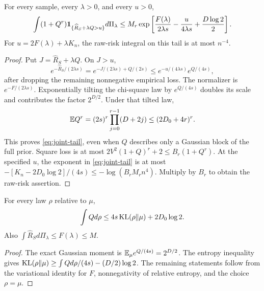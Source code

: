 \begin{lemma}
\label{lem:joint-tail}
For every sample, every $\lambda>0$, and every $u>0$,
\begin{equation}
 \int(1+Q^r)\mathbf1_{\{\widehat R_S+\lambda Q>u\}}d\Pi_\lambda
 \le M_r\exp\left[\frac{F(\lambda)}{2\lambda s}
                   -\frac{u}{4\lambda s}+\frac{D\log2}{2}\right].
 \label{eq:joint-tail}
\end{equation}
For $u=2F(\lambda)+\lambda K_n$, the raw-risk integral on this tail is at most $n^{-4}$.
\end{lemma}
\begin{proof}
Put $J=\widehat R_S+\lambda Q$. On $J>u$,
\[
 e^{-\widehat R_S/(2\lambda s)}
 =e^{-J/(2\lambda s)+Q/(2s)}
 \le e^{-u/(4\lambda s)}e^{Q/(4s)},
\]
after dropping the remaining nonnegative empirical loss. The normalizer is $e^{-F/(2\lambda s)}$. Exponentially tilting the chi-square law by $e^{Q/(4s)}$ doubles its scale and contributes the factor $2^{D/2}$. Under that tilted law,
\[
 \mathbb E Q^r=(2s)^r\prod_{j=0}^{r-1}(D+2j)
 \le(2D_0+4r)^r.
\]
This proves \eqref{eq:joint-tail}, even when $Q$ describes only a Gaussian block of the full prior. Square loss is at most
$2V^2(1+Q)^r+2\le B_r(1+Q^r)$.
At the specified $u$, the exponent in \eqref{eq:joint-tail} is at most
$-[K_n-2D_0\log2]/(4s)\le-\log(B_rM_rn^4)$.
Multiply by $B_r$ to obtain the raw-risk assertion.
\end{proof}

\begin{lemma}
\label{lem:entropy}
For every law $\rho$ relative to $\mu$,
\begin{equation}
 \int Qd\rho\le4s\operatorname{KL}(\rho\Vert\mu)+2D_0\log2.
 \label{eq:entropy}
\end{equation}
Also $\int\widehat R_Sd\Pi_\lambda\le F(\lambda)\le M$.
\end{lemma}
\begin{proof}
The exact Gaussian moment is $\mathbb E_\mu e^{Q/(4s)}=2^{D/2}$. The entropy inequality gives
$\operatorname{KL}(\rho\Vert\mu)\ge\int Qd\rho/(4s)-(D/2)\log2$.
The remaining statements follow from the variational identity for $F$, nonnegativity of relative entropy, and the choice $\rho=\mu$.
\end{proof}

